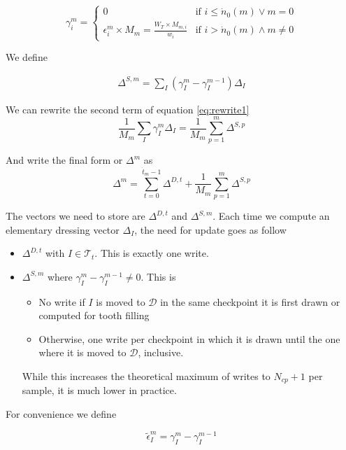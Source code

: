 \documentclass[./thesis.tex]{subfiles}
\begin{document}
\begin{equation}
\gamma^m_i = 
\begin{cases}
0 & \text{if } i \leq \dot n_0(m) \vee m=0 \\
\epsilon^m_i \times M_m = \frac{W_T \times M_{m,i}}{w_i} & \text{if } i > \dot n_0(m) \wedge m \neq 0
\end{cases}
\end{equation}

We define

\begin{align}
\Delta^{S,m} = \sum_I (\gamma^m_I - \gamma^{m-1}_I) \Delta_I
\end{align}


We can rewrite the second term of equation \ref{eq:rewrite1}
\begin{equation}
\frac{1}{M_m}\sum_{I} \gamma^m_{I} \Delta_I = \frac{1}{M_m} \sum_{p=1}^m \Delta^{S,p}
\end{equation}

And write the final form or $\Delta^m$ as
\begin{equation}
\Delta^m=\sum_{t=0}^{\dot t_{m}-1} \Delta^{D,t} + \frac{1}{M_m} \sum_{p=1}^m \Delta^{S,p}
\end{equation}

The vectors we need to store are $\Delta^{D,t}$ and $\Delta^{S,m}$. Each time we compute an elementary dressing vector $\Delta_I$, the need for update goes as follow

\begin{itemize}
\item
$\Delta^{D,t}$ with $I \in \mathcal{T}_t$. This is exactly one write.
\item
$\Delta^{S,m}$ where $\gamma^m_I - \gamma^{m-1}_I \neq 0$. This is
 \begin{itemize}
 \item
 	No write if $I$ is moved to $\mathcal{D}$ in the same checkpoint it is first drawn or computed for tooth filling
 \item
 	Otherwise, one write per checkpoint in which it is drawn until the one where it is moved to $\mathcal{D}$, inclusive.
 \end{itemize}
 While this increases the theoretical maximum of writes to $N_{cp}+1$ per sample, it is much lower in practice.
\end{itemize}

For convenience we define

\begin{equation}
\tilde \epsilon^m_I = \gamma^m_I - \gamma^{m-1}_I
\end{equation}
\end{document}

